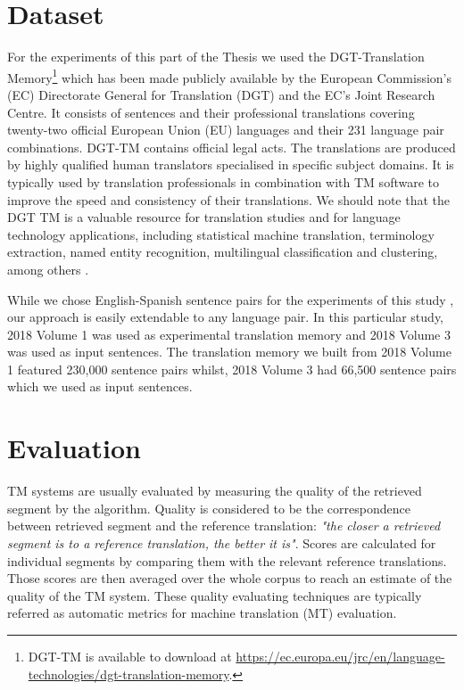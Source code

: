 \section{Dataset}
\label{sec:tm_data}
For the experiments of this part of the Thesis we used the DGT-Translation Memory\footnote{DGT-TM is available to download at \url{https://ec.europa.eu/jrc/en/language-technologies/dgt-translation-memory}.} which has been made publicly available by the European Commission’s (EC) Directorate General for Translation (DGT) and the EC’s Joint Research Centre. It consists of sentences and their professional translations covering twenty-two official European Union (EU) languages and their 231 language pair combinations. DGT-TM contains official legal acts. The translations are produced by highly qualified human translators specialised in specific subject domains. It is typically used by translation professionals in combination with TM software to improve the speed and consistency of their translations. We should note that the DGT TM is a valuable resource for translation studies and for language technology applications, including statistical machine translation, terminology extraction, named entity recognition, multilingual classification and clustering, among others \autocite{aker-etal-2013-extracting, besacier-schwartz-2015-automated}. 

While we chose English-Spanish sentence pairs for the experiments of this study , our approach is easily extendable to any language pair. In this particular study, 2018 Volume 1 was used as experimental translation memory and 2018 Volume 3 was used as input sentences. The translation memory we built from 2018 Volume 1 featured 230,000 sentence pairs whilst, 2018 Volume 3 had 66,500 sentence pairs which we used as input sentences. 

\section{Evaluation}
\label{sec:tm_eval}
TM systems are usually evaluated by measuring the quality of the retrieved segment by the algorithm. Quality is considered to be the correspondence between retrieved segment and the reference translation: \textit{"the closer a retrieved segment is to a reference translation, the better it is"}. Scores are calculated for individual segments by comparing them with the relevant reference translations.  Those scores are then averaged over the whole corpus to reach an estimate of the quality of the TM system. These quality evaluating techniques are typically referred as automatic metrics for machine translation (MT) evaluation.

